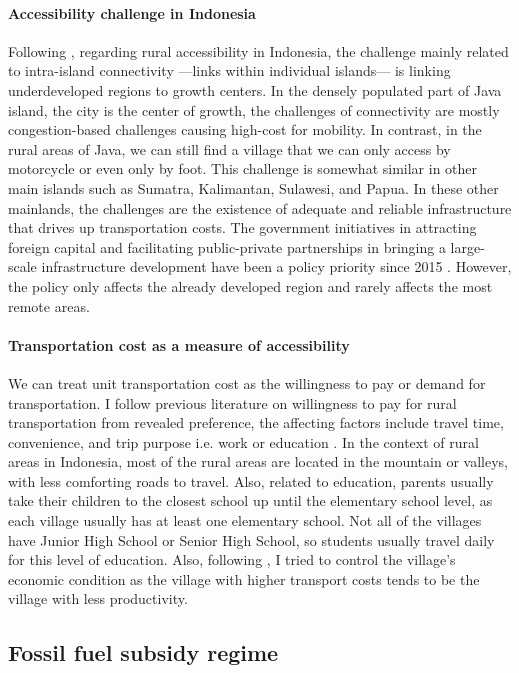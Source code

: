 \documentclass[letterpaper,12pt,leqno]{article}
\begin{document}
\paragraph{Accessibility challenge in Indonesia}
Following \citet{sandee_2016}, regarding rural accessibility in Indonesia, the challenge mainly related to intra-island connectivity ---links within individual islands--- is linking underdeveloped regions to growth centers. In the densely populated part of Java island, the city is the center of growth, the challenges of connectivity are mostly congestion-based challenges causing high-cost for mobility. In contrast, in the rural areas of Java, we can still find a village that we can only access by motorcycle or even only by foot. This challenge is somewhat similar in other main islands such as Sumatra, Kalimantan, Sulawesi, and Papua. In these other mainlands, the challenges are the existence of adequate and reliable infrastructure that drives up transportation costs. The government initiatives in attracting foreign capital and facilitating public-private partnerships in bringing a large-scale infrastructure development have been a policy priority since 2015 \citep{pwc_2016,kpmg_2019}. However, the policy only affects the already developed region and rarely affects the most remote areas.

\paragraph{Transportation cost as a measure of accessibility} We can treat unit transportation cost as the willingness to pay or demand for transportation. I follow previous literature on willingness to pay for rural transportation from revealed preference, the affecting factors include travel time, convenience, and trip purpose i.e. work or education \citep{phanikumar_2006}. In the context of rural areas in Indonesia, most of the rural areas are located in the mountain or valleys, with less comforting roads to travel. Also, related to education, parents usually take their children to the closest school up until the elementary school level, as each village usually has at least one elementary school. Not all of the villages have Junior High School or Senior High School, so students usually travel daily for this level of education. Also, following \citet{sambodo_2019}, I tried to control the village's economic condition as the village with higher transport costs tends to be the village with less productivity.

\subsection{Fossil fuel subsidy regime}\label{ss:fuelsubsidy}
\end{document}
